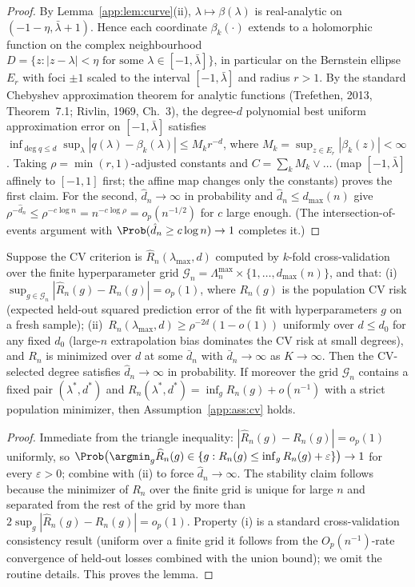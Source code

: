 \begin{proof}
By Lemma~\ref{app:lem:curve}(ii), $\lambda\mapsto\beta(\lambda)$ is
real-analytic on $(-1-\eta,\bar\lambda+1)$. Hence each coordinate
$\beta_k(\cdot)$ extends to a holomorphic function on the complex
neighbourhood $D=\{z:|z-\lambda|<\eta \text{ for some }
\lambda\in[-1,\bar\lambda]\}$, in particular on the Bernstein ellipse
$E_r$ with foci $\pm 1$ scaled to the interval $[-1,\bar\lambda]$ and
radius $r>1$. By the standard Chebyshev approximation theorem for
analytic functions (Trefethen, 2013, Theorem~7.1; Rivlin, 1969, Ch.~3), the degree-$d$
polynomial best uniform approximation error on $[-1,\bar\lambda]$
satisfies
$\inf_{\deg q\le d}\sup_{\lambda}|q(\lambda)-\beta_k(\lambda)|
\le M_k r^{-d}$, where
$M_k=\sup_{z\in E_r}|\beta_k(z)|<\infty$. Taking
$\rho=\min(r,1)$-adjusted constants and
$C=\sum_k M_k\vee\ldots$ (map $[-1,\bar\lambda]$ affinely to $[-1,1]$
first; the affine map changes only the constants) proves the first claim.
For the second, $\hat d_n\to\infty$ in probability and
$\hat d_n\le d_{\max}(n)$ give
$\rho^{-\hat d_n}\le\rho^{-c\log n}=n^{-c\log\rho}=o_p(n^{-1/2})$ for
$c$ large enough. (The intersection-of-events argument with
$\Prob(\hat d_n\ge c\log n)\to 1$ completes it.)
\end{proof}

\begin{lemma}\label{app:lem:cv}
Suppose the CV criterion is $\widehat R_n(\lambda_{\max},d)$ computed by
$k$-fold cross-validation over the finite hyperparameter grid
$\mathcal G_n=\Lambda_n^{\max}\times\{1,\dots,d_{\max}(n)\}$, and that:
(i)~$\sup_{g\in\mathcal G_n}|\widehat R_n(g)-R_n(g)|=o_p(1)$, where
$R_n(g)$ is the population CV risk (expected held-out squared prediction
error of the \asimex{} fit with hyperparameters $g$ on a fresh sample);
(ii)~$R_n(\lambda_{\max},d)\ge \rho^{-2d}(1-o(1))$ uniformly over
$d\le d_0$ for any fixed $d_0$ (large-$n$ extrapolation bias dominates
the CV risk at small degrees), and $R_n$ is minimized over $d$ at some
$\bar d_n$ with $\bar d_n\to\infty$ as $K\to\infty$.
Then the CV-selected degree satisfies
$\hat d_n\to\infty$ in probability. If moreover the grid
$\mathcal G_n$ contains a fixed pair $(\lambda^*,d^*)$ and
$R_n(\lambda^*,d^*)=\inf_g R_n(g)+o(n^{-1})$ with a strict population
minimizer, then Assumption~\ref{app:ass:cv} holds.
\end{lemma}

\begin{proof}
Immediate from the triangle inequality:
$|\widehat R_n(g)-R_n(g)|=o_p(1)$ uniformly, so
$\Prob\bigl(\argmin_g\widehat R_n(g)\in\{g:R_n(g)\le\inf_gR_n(g)+\varepsilon\}\bigr)
\to 1$ for every $\varepsilon>0$; combine with (ii) to force
$\hat d_n\to\infty$. The stability claim follows because the minimizer of
$R_n$ over the finite grid is unique for large $n$ and separated from the
rest of the grid by more than $2\sup_g|\widehat R_n(g)-R_n(g)|=o_p(1)$.
Property (i) is a standard cross-validation consistency result
(uniform over a finite grid it follows from the $O_p(n^{-1})$-rate
convergence of held-out losses combined with the union bound); we omit the
routine details. This proves the lemma.
\end{proof}

